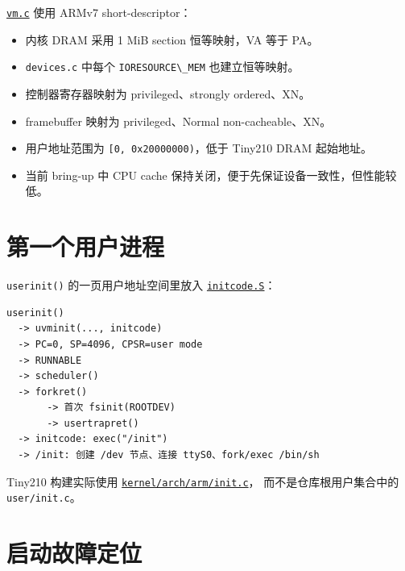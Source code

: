 \href{../../../kernel/arch/arm/vm.c}{\passthrough{\lstinline!vm.c!}}
使用 ARMv7 short-descriptor：

\begin{itemize}
\tightlist
\item
  内核 DRAM 采用 1 MiB section 恒等映射，VA 等于 PA。
\item
  \passthrough{\lstinline!devices.c!} 中每个
  \passthrough{\lstinline!IORESOURCE\_MEM!} 也建立恒等映射。
\item
  控制器寄存器映射为 privileged、strongly ordered、XN。
\item
  framebuffer 映射为 privileged、Normal non-cacheable、XN。
\item
  用户地址范围为 \passthrough{\lstinline![0, 0x20000000)!}，低于 Tiny210
  DRAM 起始地址。
\item
  当前 bring-up 中 CPU cache
  保持关闭，便于先保证设备一致性，但性能较低。
\end{itemize}

\section{第一个用户进程}\label{ux7b2cux4e00ux4e2aux7528ux6237ux8fdbux7a0b}

\passthrough{\lstinline!userinit()!} 的一页用户地址空间里放入
\href{../../../kernel/arch/arm/initcode.S}{\passthrough{\lstinline!initcode.S!}}：

\begin{lstlisting}
userinit()
  -> uvminit(..., initcode)
  -> PC=0, SP=4096, CPSR=user mode
  -> RUNNABLE
  -> scheduler()
  -> forkret()
       -> 首次 fsinit(ROOTDEV)
       -> usertrapret()
  -> initcode: exec("/init")
  -> /init: 创建 /dev 节点、连接 ttyS0、fork/exec /bin/sh
\end{lstlisting}

Tiny210 构建实际使用
\href{../../../kernel/arch/arm/init.c}{\passthrough{\lstinline!kernel/arch/arm/init.c!}}，
而不是仓库根用户集合中的 \passthrough{\lstinline!user/init.c!}。

\section{启动故障定位}\label{ux542fux52a8ux6545ux969cux5b9aux4f4d}

